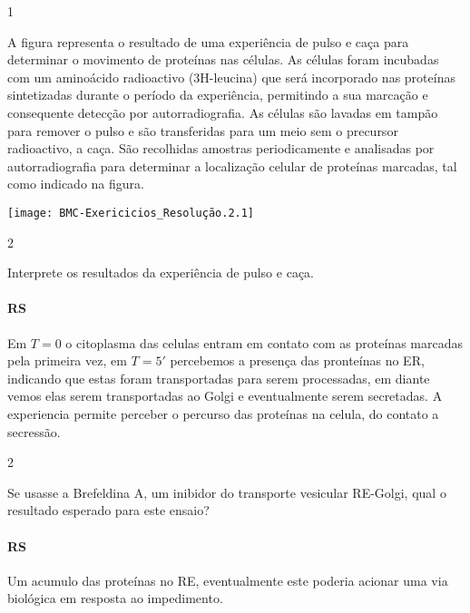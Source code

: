 \documentclass[\mainfilename]{subfiles}
\begin{document}
\begin{questionBox}1{}
    
    A figura representa o resultado de uma experiência de pulso e caça para determinar o movimento de proteínas nas células. As células foram incubadas com um aminoácido radioactivo (3H-leucina) que será incorporado nas proteínas sintetizadas durante o período da experiência, permitindo a sua marcação e consequente detecção por autorradiografia. As células são lavadas em tampão para remover o pulso e são transferidas para um meio sem o precursor radioactivo, a caça. São recolhidas amostras periodicamente e analisadas por autorradiografia para determinar a localização celular de proteínas marcadas, tal como indicado na figura.


    \begin{center}
        \texttt{[image: BMC-Exericicios\_Resolução.2.1]}
    \end{center}
    
\end{questionBox}

\begin{questionBox}2{}
    
    Interprete os resultados da experiência de pulso e caça.

    \paragraph{RS} 
    Em \(T=0\) o citoplasma das celulas entram em contato com as proteínas marcadas pela primeira vez,
    em \(T=5'\) percebemos a presença das pronteínas no ER, indicando que estas foram transportadas para serem processadas, em diante vemos elas serem transportadas ao Golgi e eventualmente serem secretadas.
    A experiencia permite perceber o percurso das proteínas na celula, do contato a secressão.
    
\end{questionBox}

\begin{questionBox}2{}
    
    Se usasse a Brefeldina A, um inibidor do transporte vesicular RE-Golgi, qual o resultado esperado para este ensaio?

    \paragraph*{RS} Um acumulo das proteínas no RE, eventualmente este poderia acionar uma via biológica em resposta ao impedimento.

\end{questionBox}
\end{document}
